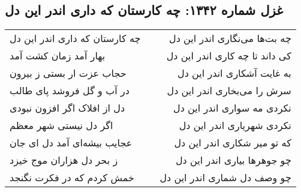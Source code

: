 \begin{center}
\section*{غزل شماره ۱۳۴۲: چه کارستان که داری اندر این دل}
\label{sec:1342}
\begin{longtable}{l p{0.5cm} r}
چه کارستان که داری اندر این دل
&&
چه بت‌ها می‌نگاری اندر این دل
\\
بهار آمد زمان کشت آمد
&&
کی داند تا چه کاری اندر این دل
\\
حجاب عزت ار بستی ز بیرون
&&
به غایت آشکاری اندر این دل
\\
در آب و گل فروشد پای طالب
&&
سرش را می‌بخاری اندر این دل
\\
دل از افلاک اگر افزون نبودی
&&
نکردی مه سواری اندر این دل
\\
اگر دل نیستی شهر معظم
&&
نکردی شهریاری اندر این دل
\\
عجایب بیشه‌ای آمد دل ای جان
&&
که تو میر شکاری اندر این دل
\\
ز بحر دل هزاران موج خیزد
&&
چو جوهرها بیاری اندر این دل
\\
خمش کردم که در فکرت نگنجد
&&
چو وصف دل شماری اندر این دل
\\
\end{longtable}
\end{center}
